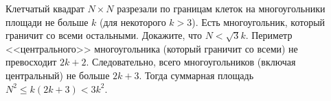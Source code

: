 \problem
Клетчатый квадрат $N \times N$ разрезали по границам клеток на многоугольники
площади не больше $k$ (для некоторого $k > 3$).
Есть многоугольник, который граничит со всеми остальными.
Докажите, что $N < \sqrt{3} k$.
\solution
Периметр <<центрального>> многоугольника (который граничит со всеми) не
превосходит $2 k + 2$.
Следовательно, всего многоугольников (включая центральный) не больше $2 k + 3$.
Тогда суммарная площадь $N^2 \leq k (2 k + 3) < 3 k^2$.
\endproblem
